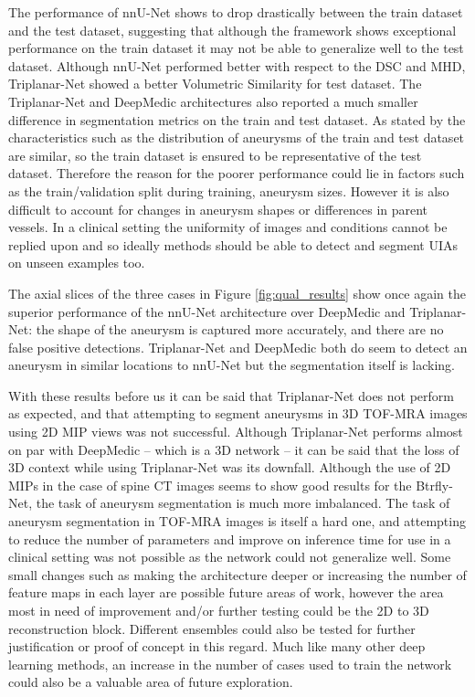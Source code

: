 The performance of nnU-Net shows to drop drastically between the train dataset and the test dataset, suggesting that although the framework shows exceptional performance on the train dataset it may not be able to generalize well to the test dataset. Although nnU-Net performed better with respect to the DSC and MHD, Triplanar-Net showed a better Volumetric Similarity for test dataset. The Triplanar-Net and DeepMedic architectures also reported a much smaller difference in segmentation metrics on the train and test dataset. As stated by \citeauthor{Timmins2020} the characteristics such as the distribution of aneurysms of the train and test dataset are similar, so the train dataset is ensured to be representative of the test dataset. Therefore the reason for the poorer performance could lie in factors such as the train/validation split during training, aneurysm sizes. However it is also difficult to account for changes in aneurysm shapes or differences in parent vessels. In a clinical setting the uniformity of images and conditions cannot be replied upon and so ideally methods should be able to detect and segment UIAs on unseen examples too.

The axial slices of the three cases in Figure \ref{fig:qual_results} show once again the superior performance of the nnU-Net architecture over DeepMedic and Triplanar-Net: the shape of the aneurysm is captured more accurately, and there are no false positive detections. Triplanar-Net and DeepMedic both do seem to detect an aneurysm in similar locations to nnU-Net but the segmentation itself is lacking.

With these results before us it can be said that Triplanar-Net does not perform as expected, and that attempting to segment aneurysms in 3D TOF-MRA images using 2D MIP views was not successful. Although Triplanar-Net performs almost on par with DeepMedic -- which is a 3D network -- it can be said that the loss of 3D context while using Triplanar-Net was its downfall. Although the use of 2D MIPs in the case of spine CT images seems to show good results for the Btrfly-Net, the task of aneurysm segmentation is much more imbalanced. The task of aneurysm segmentation in TOF-MRA images is itself a hard one, and attempting to reduce the number of parameters and improve on inference time for use in a clinical setting was not possible as the network could not generalize well. Some small changes such as making the architecture deeper or increasing the number of feature maps in each layer are possible future areas of work, however the area most in need of improvement and/or further testing could be the 2D to 3D reconstruction block. Different ensembles could also be tested for further justification or proof of concept in this regard. Much like many other deep learning methods, an increase in the number of cases used to train the network could also be a valuable area of future exploration. 






